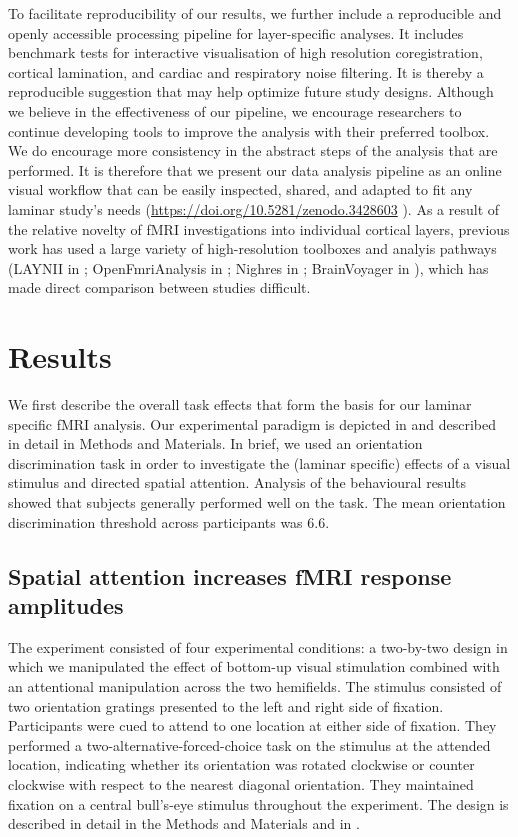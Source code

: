 \documentclass[9pt,lineno]{aperture}
\begin{document}
To facilitate reproducibility of our results, we further include a reproducible and openly accessible processing pipeline for layer-specific analyses. It includes benchmark tests for interactive visualisation of high resolution coregistration, cortical lamination, and cardiac and respiratory noise filtering. It is thereby a reproducible suggestion that may help optimize future study designs. Although we believe in the effectiveness of our pipeline, we encourage researchers to continue developing tools to improve the analysis with their preferred toolbox. We do encourage more consistency in the abstract steps of the analysis that are performed. It is therefore that we present our data analysis pipeline as an online visual workflow that can be easily inspected, shared, and adapted to fit any laminar study’s needs (\url{https://doi.org/10.5281/zenodo.3428603} \citep{VanMourik2018}). As a result of the relative novelty of fMRI investigations into individual cortical layers, previous work has used a large variety of high-resolution toolboxes and analyis pathways (LAYNII in \citet{Huber2017,Huber2018}; OpenFmriAnalysis in \citet{Lawrence2018}; Nighres in \citet{Huntenburg2018}; BrainVoyager in \citet{Goebel2012}), which has made direct comparison between studies difficult. 

\section{Results}
We first describe the overall task effects that form the basis for our laminar specific fMRI analysis. Our experimental paradigm is depicted in  and described in detail in Methods and Materials. In brief, we used an orientation discrimination task in order to investigate the (laminar specific) effects of a visual stimulus and directed spatial attention. Analysis of the behavioural results showed that subjects generally performed well on the task. The mean orientation discrimination threshold across participants was 6.6\textdegree.

\subsection{Spatial attention increases fMRI response amplitudes}
The experiment consisted of four experimental conditions: a two-by-two design in which we manipulated the effect of bottom-up visual stimulation combined with an attentional manipulation across the two hemifields. The stimulus consisted of two orientation gratings presented to the left and right side of fixation. Participants were cued to attend to one location at either side of fixation. They performed a two-alternative-forced-choice task on the stimulus at the attended location, indicating whether its orientation was rotated clockwise or counter clockwise with respect to the nearest diagonal orientation. They maintained fixation on a central bull's-eye stimulus throughout the experiment. The design is described in detail in the Methods and Materials and in .
\end{document}
